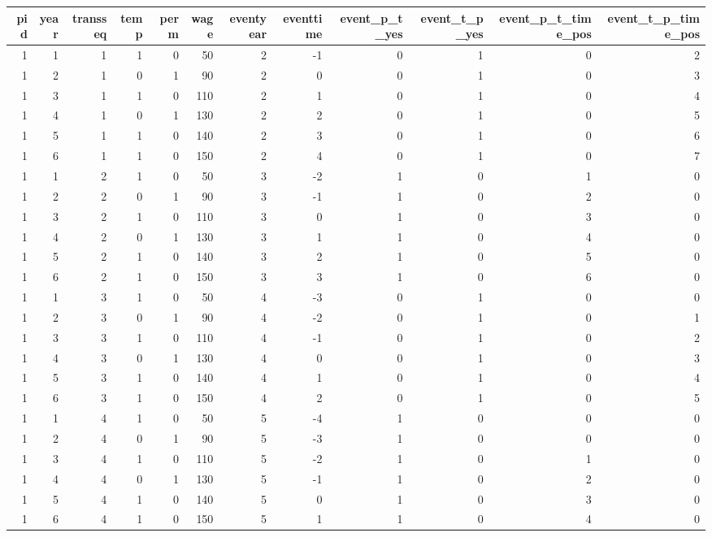 \begin{tabular}{rrrrrrrrrrrr}
  \hline
pid & year & transseq & temp & perm & wage & eventyear & eventtime & event\_p\_t\_yes & event\_t\_p\_yes & event\_p\_t\_time\_pos & event\_t\_p\_time\_pos \\ 
  \hline
1 & 1 & 1 & 1 & 0 & 50 & 2 & -1 & 0 & 1 & 0 & 2 \\ 
  1 & 2 & 1 & 0 & 1 & 90 & 2 & 0 & 0 & 1 & 0 & 3 \\ 
  1 & 3 & 1 & 1 & 0 & 110 & 2 & 1 & 0 & 1 & 0 & 4 \\ 
  1 & 4 & 1 & 0 & 1 & 130 & 2 & 2 & 0 & 1 & 0 & 5 \\ 
  1 & 5 & 1 & 1 & 0 & 140 & 2 & 3 & 0 & 1 & 0 & 6 \\ 
  1 & 6 & 1 & 1 & 0 & 150 & 2 & 4 & 0 & 1 & 0 & 7 \\ 
  1 & 1 & 2 & 1 & 0 & 50 & 3 & -2 & 1 & 0 & 1 & 0 \\ 
  1 & 2 & 2 & 0 & 1 & 90 & 3 & -1 & 1 & 0 & 2 & 0 \\ 
  1 & 3 & 2 & 1 & 0 & 110 & 3 & 0 & 1 & 0 & 3 & 0 \\ 
  1 & 4 & 2 & 0 & 1 & 130 & 3 & 1 & 1 & 0 & 4 & 0 \\ 
  1 & 5 & 2 & 1 & 0 & 140 & 3 & 2 & 1 & 0 & 5 & 0 \\ 
  1 & 6 & 2 & 1 & 0 & 150 & 3 & 3 & 1 & 0 & 6 & 0 \\ 
  1 & 1 & 3 & 1 & 0 & 50 & 4 & -3 & 0 & 1 & 0 & 0 \\ 
  1 & 2 & 3 & 0 & 1 & 90 & 4 & -2 & 0 & 1 & 0 & 1 \\ 
  1 & 3 & 3 & 1 & 0 & 110 & 4 & -1 & 0 & 1 & 0 & 2 \\ 
  1 & 4 & 3 & 0 & 1 & 130 & 4 & 0 & 0 & 1 & 0 & 3 \\ 
  1 & 5 & 3 & 1 & 0 & 140 & 4 & 1 & 0 & 1 & 0 & 4 \\ 
  1 & 6 & 3 & 1 & 0 & 150 & 4 & 2 & 0 & 1 & 0 & 5 \\ 
  1 & 1 & 4 & 1 & 0 & 50 & 5 & -4 & 1 & 0 & 0 & 0 \\ 
  1 & 2 & 4 & 0 & 1 & 90 & 5 & -3 & 1 & 0 & 0 & 0 \\ 
  1 & 3 & 4 & 1 & 0 & 110 & 5 & -2 & 1 & 0 & 1 & 0 \\ 
  1 & 4 & 4 & 0 & 1 & 130 & 5 & -1 & 1 & 0 & 2 & 0 \\ 
  1 & 5 & 4 & 1 & 0 & 140 & 5 & 0 & 1 & 0 & 3 & 0 \\ 
  1 & 6 & 4 & 1 & 0 & 150 & 5 & 1 & 1 & 0 & 4 & 0 \\ 
   \hline
\end{tabular}
